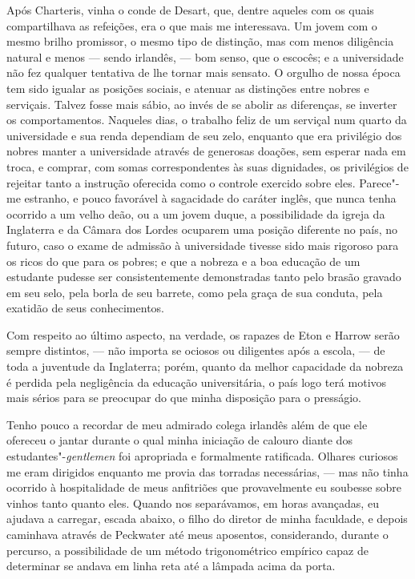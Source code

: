 Após Charteris, vinha o conde de Desart, que, dentre aqueles com os
quais compartilhava as refeições, era o que mais me interessava. Um
jovem com o mesmo brilho promissor, o mesmo tipo de distinção, mas com
menos diligência natural e menos --- sendo irlandês, --- bom senso, que o
escocês; e a universidade não fez qualquer tentativa de lhe tornar mais
sensato. O orgulho de nossa época tem sido igualar as posições sociais,
e atenuar as distinções entre nobres e serviçais. Talvez fosse mais
sábio, ao invés de se abolir as diferenças, se inverter os
comportamentos. Naqueles dias, o trabalho feliz de um serviçal num
quarto da universidade e sua renda dependiam de seu zelo, enquanto que
era privilégio dos nobres manter a universidade através de generosas
doações, sem esperar nada em troca, e comprar, com somas correspondentes
às suas dignidades, os privilégios de rejeitar tanto a instrução
oferecida como o controle exercido sobre eles. Parece"-me estranho, e
pouco favorável à sagacidade do caráter inglês, que nunca tenha ocorrido
a um velho deão, ou a um jovem duque, a possibilidade da igreja da
Inglaterra e da Câmara dos Lordes ocuparem uma posição diferente no
país, no futuro, caso o exame de admissão à universidade tivesse sido
mais rigoroso para os ricos do que para os pobres; e que a nobreza e a
boa educação de um estudante pudesse ser consistentemente demonstradas
tanto pelo brasão gravado em seu selo, pela borla de seu barrete, como
pela graça de sua conduta, pela exatidão de seus conhecimentos.

Com respeito ao último aspecto, na verdade, os rapazes de Eton e Harrow
serão sempre distintos, --- não importa se ociosos ou diligentes após a
escola, --- de toda a juventude da Inglaterra; porém, quanto da melhor
capacidade da nobreza é perdida pela negligência da educação
universitária, o país logo terá motivos mais sérios para se preocupar do
que minha disposição para o presságio.

Tenho pouco a recordar de meu admirado colega irlandês além de que ele
ofereceu o jantar durante o qual minha iniciação de calouro diante dos
estudantes"-\textit{gentlemen} foi apropriada e formalmente ratificada.
Olhares curiosos me eram dirigidos enquanto me provia das torradas
necessárias, --- mas não tinha ocorrido à hospitalidade de meus
anfitriões que provavelmente eu soubesse sobre vinhos tanto quanto eles.
Quando nos separávamos, em horas avançadas, eu ajudava a carregar,
escada abaixo, o filho do diretor de minha faculdade, e depois caminhava
através de Peckwater até meus aposentos, considerando, durante o
percurso, a possibilidade de um método trigonométrico empírico capaz de
determinar se andava em linha reta até a lâmpada acima da porta.

